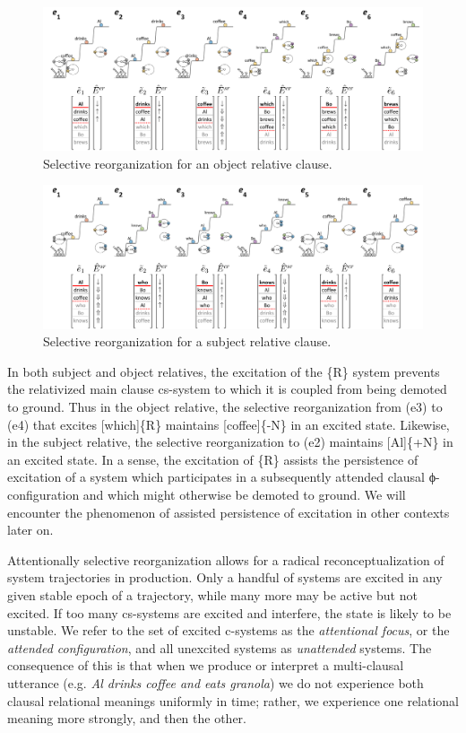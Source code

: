   
\begin{figure}
\includegraphics[width=\textwidth]{figures/Tilsen-img102.png}
\caption{Selective reorganization for an object relative clause.}
\label{fig:4:52}
\end{figure}
 

  
\begin{figure}
\includegraphics[width=\textwidth]{figures/Tilsen-img103.png}
\caption{Selective reorganization for a subject relative clause.}
\label{fig:4:53}
\end{figure}
 

  In both subject and object relatives, the excitation of the \{R\} system prevents the relativized main clause cs-system to which it is coupled from being demoted to ground. Thus in the object relative, the selective reorganization from (e3) to (e4) that excites [which]\{R\} maintains [coffee]\{-N\} in an excited state. Likewise, in the subject relative, the selective reorganization to (e2) maintains [Al]\{+N\} in an excited state. In a sense, the excitation of \{R\} assists the persistence of excitation of a system which participates in a subsequently attended clausal ϕ-configuration and which might otherwise be demoted to ground. We will encounter the phenomenon of assisted persistence of excitation in other contexts later on.

Attentionally selective reorganization allows for a radical reconceptualization of system trajectories in production.  Only a handful of systems are excited in any given stable epoch of a trajectory, while many more may be active but not excited. If too many cs-systems are excited and interfere, the state is likely to be unstable. We refer to the set of excited c-systems as the \textit{attentional focus}, or the \textit{attended configuration}, and all unexcited systems as \textit{unattended} systems. The consequence of this is that when we produce or interpret a multi-clausal utterance (e.g. \textit{Al drinks coffee and eats granola}) we do not experience both clausal relational meanings uniformly in time; rather, we experience one relational meaning more strongly, and then the other.

